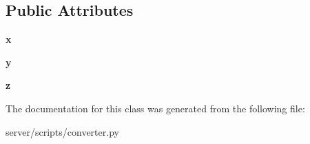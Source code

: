 \subsection*{Public Attributes}
\begin{DoxyCompactItemize}
\item 
\hypertarget{classconverter_1_1Vector3_af3058707c8bbd7fa969178ce71d77ceb}{{\bfseries x}}\label{classconverter_1_1Vector3_af3058707c8bbd7fa969178ce71d77ceb}

\item 
\hypertarget{classconverter_1_1Vector3_a708bfe32a7adfb7581fec7a0f599bf19}{{\bfseries y}}\label{classconverter_1_1Vector3_a708bfe32a7adfb7581fec7a0f599bf19}

\item 
\hypertarget{classconverter_1_1Vector3_a984464ea639e821c57ee62a6cd1beb4c}{{\bfseries z}}\label{classconverter_1_1Vector3_a984464ea639e821c57ee62a6cd1beb4c}

\end{DoxyCompactItemize}


The documentation for this class was generated from the following file\-:\begin{DoxyCompactItemize}
\item 
server/scripts/converter.\-py\end{DoxyCompactItemize}
